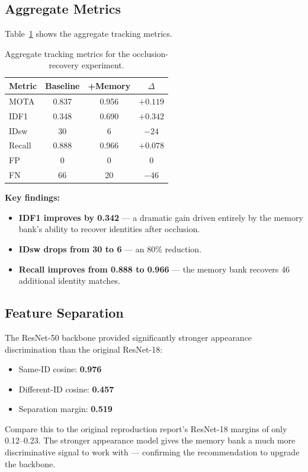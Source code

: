 \documentclass[11pt,a4paper]{article}
\begin{document}
\subsection{Aggregate Metrics}
Table~\ref{tab:occlusion_agg} shows the aggregate tracking metrics.

\begin{table}[H]
\centering
\caption{Aggregate tracking metrics for the occlusion-recovery experiment.}
\label{tab:occlusion_agg}
\begin{tabular}{@{}lccc@{}}
\toprule
\textbf{Metric} & \textbf{Baseline} & \textbf{+Memory} & $\Delta$ \\
\midrule
MOTA & 0.837 & 0.956 & $+0.119$ \\
IDF1 & 0.348 & 0.690 & $+0.342$ \\
IDsw & 30 & 6 & $-24$ \\
Recall & 0.888 & 0.966 & $+0.078$ \\
FP & 0 & 0 & $0$ \\
FN & 66 & 20 & $-46$ \\
\bottomrule
\end{tabular}
\end{table}

\textbf{Key findings:}
\begin{itemize}[leftmargin=2em]
    \item \textbf{IDF1 improves by 0.342} --- a dramatic gain driven entirely by the memory bank's ability to recover identities after occlusion.
    \item \textbf{IDsw drops from 30 to 6} --- an 80\% reduction.
    \item \textbf{Recall improves from 0.888 to 0.966} --- the memory bank recovers 46 additional identity matches.
\end{itemize}

\subsection{Feature Separation}
The ResNet-50 backbone provided significantly stronger appearance discrimination than the original ResNet-18:
\begin{itemize}[leftmargin=2em]
    \item Same-ID cosine: \textbf{0.976}
    \item Different-ID cosine: \textbf{0.457}
    \item Separation margin: \textbf{0.519}
\end{itemize}

Compare this to the original reproduction report's ResNet-18 margins of only 0.12--0.23. The stronger appearance model gives the memory bank a much more discriminative signal to work with --- confirming the recommendation to upgrade the backbone.
\end{document}
